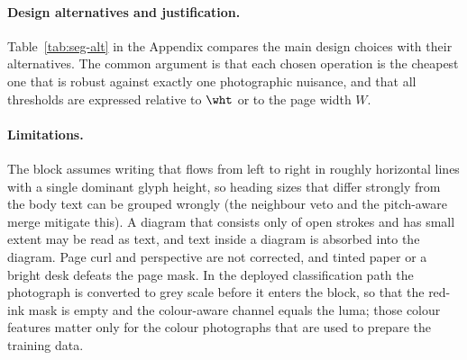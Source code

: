 \paragraph{Design alternatives and justification.}
Table~\ref{tab:seg-alt} in the Appendix compares the main design choices with their alternatives.
The common argument is that each chosen operation is the cheapest one that is robust against exactly one photographic nuisance, and that all thresholds are expressed relative to $\wht$ or to the page width $W$.

\paragraph{Limitations.}
The block assumes writing that flows from left to right in roughly horizontal lines with a single dominant glyph height, so heading sizes that differ strongly from the body text can be grouped wrongly (the neighbour veto and the pitch-aware merge mitigate this).
A diagram that consists only of open strokes and has small extent may be read as text, and text inside a diagram is absorbed into the diagram.
Page curl and perspective are not corrected, and tinted paper or a bright desk defeats the page mask.
In the deployed classification path the photograph is converted to grey scale before it enters the block, so that the red-ink mask is empty and the colour-aware channel equals the luma; those colour features matter only for the colour photographs that are used to prepare the training data.
